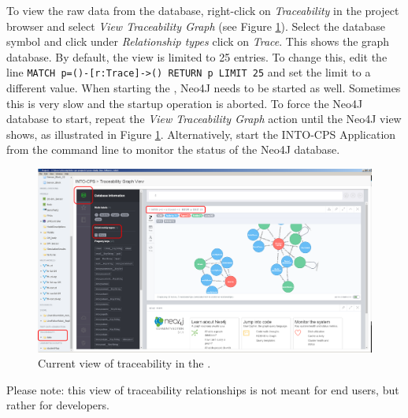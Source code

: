 To view the raw data from the database, right-click on \textit{Traceability} in the \intoapp{} project browser and select \textit{View Traceability Graph} (see Figure \ref{fig:app_trace}). Select the database symbol and click under \textit{Relationship types} click on \textit{Trace}. This shows the graph database. By default, the view is limited to 25 entries. To change this, edit the line \texttt{MATCH p=()-[r:Trace]->() RETURN p LIMIT 25} and set the limit to a different value. When starting the \intoapp{}, Neo4J needs to be started as well. Sometimes this is very slow and the startup operation is aborted. To force the Neo4J database to start, repeat the \textit{View Traceability Graph} action until the Neo4J view shows, as illustrated in Figure \ref{fig:app_trace}. Alternatively, start the INTO-CPS Application from the command line to monitor the status of the Neo4J database.
%
%
%
\begin{figure}[htbp]
	\centering
		\includegraphics[width=1.00\textwidth]{figures/app_traceability01.png}
	\caption{Current view of traceability in the \intoapp.}
	\label{fig:app_trace}
\end{figure}
%
%
%
Please note: this view of traceability relationships is not meant for end users, but rather for developers.
%
%
%
